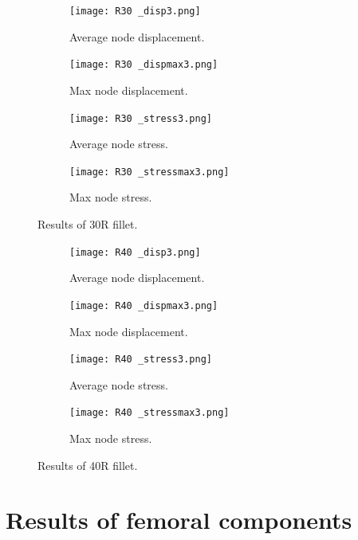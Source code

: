 \documentclass[../main.tex]{subfiles}
\begin{document}
\begin{figure}
  \centering 
  \begin{subfigure}[b]{0.45\textwidth}
    \centering 
    \texttt{[image: R30 \_disp3.png]}
    \caption{Average node displacement.}
    \label{}
  \end{subfigure}
  \begin{subfigure}[b]{0.45\textwidth}
    \centering 
    \texttt{[image: R30 \_dispmax3.png]}
    \caption{Max node displacement.}
    \label{}
  \end{subfigure}
  \begin{subfigure}[b]{0.45\textwidth}
    \centering 
    \texttt{[image: R30 \_stress3.png]}
    \caption{Average node stress.}
    \label{}
  \end{subfigure}
  \begin{subfigure}[b]{0.45\textwidth}
    \centering 
    \texttt{[image: R30 \_stressmax3.png]}
    \caption{Max node stress.}
    \label{}
  \end{subfigure}
  \caption{Results of 30R fillet.}
\end{figure}

\begin{figure}
  \centering 
  \begin{subfigure}[b]{0.45\textwidth}
    \centering 
    \texttt{[image: R40 \_disp3.png]}
    \caption{Average node displacement.}
    \label{}
  \end{subfigure}
  \begin{subfigure}[b]{0.45\textwidth}
    \centering 
    \texttt{[image: R40 \_dispmax3.png]}
    \caption{Max node displacement.}
    \label{}
  \end{subfigure}
  \begin{subfigure}[b]{0.45\textwidth}
    \centering 
    \texttt{[image: R40 \_stress3.png]}
    \caption{Average node stress.}
    \label{}
  \end{subfigure}
  \begin{subfigure}[b]{0.45\textwidth}
    \centering 
    \texttt{[image: R40 \_stressmax3.png]}
    \caption{Max node stress.}
    \label{}
  \end{subfigure}
  \caption{Results of 40R fillet.}
\end{figure}

\clearpage

\section{Results of femoral components}
\end{document}
